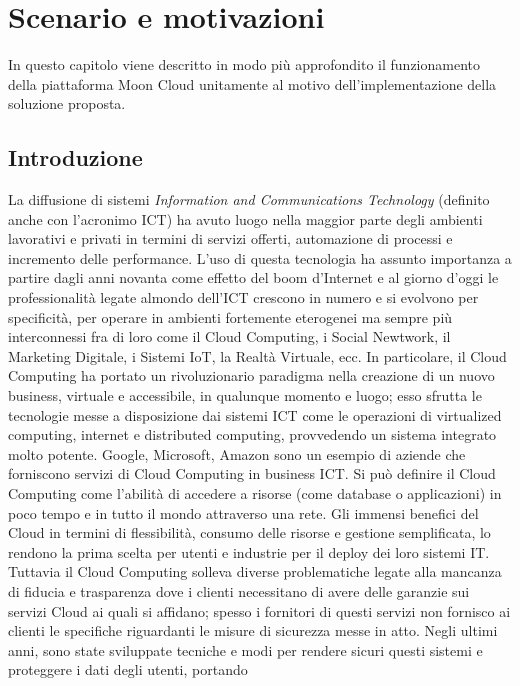 \chapter{Scenario e motivazioni}\label{chp:01-overview}
In questo capitolo viene descritto in modo più approfondito il funzionamento della piattaforma Moon Cloud unitamente al 
motivo dell'implementazione della soluzione proposta.
%
\section{Introduzione}
La diffusione di sistemi \textit{Information and Communications Technology} (definito anche con l'acronimo ICT) ha avuto luogo nella 
maggior parte degli ambienti lavorativi e privati in termini di servizi offerti, automazione di processi e incremento delle performance. 
L'uso di questa tecnologia ha assunto importanza a partire dagli anni novanta come effetto del boom d'Internet e al giorno d'oggi le 
professionalità legate almondo dell'ICT crescono in numero e si evolvono per specificità, per operare in ambienti fortemente eterogenei 
ma sempre più interconnessi fra di loro come il Cloud Computing, i Social Newtwork, il Marketing Digitale, i Sistemi IoT, 
la Realtà Virtuale, ecc.
\vspace{0.5 cm}
\hfill\break
In particolare, il Cloud Computing ha portato un rivoluzionario paradigma nella creazione di un nuovo business, virtuale e accessibile, 
in qualunque momento e luogo; esso sfrutta le tecnologie messe a disposizione dai sistemi ICT come le operazioni di virtualized computing, 
internet e distributed computing, provvedendo un sistema integrato molto potente. Google, Microsoft, Amazon sono un esempio di 
aziende che forniscono servizi di Cloud Computing in business ICT. Si può definire il Cloud Computing come l'abilità di accedere a 
risorse (come database o applicazioni) in poco tempo e in tutto il mondo attraverso una rete.\hfill\break
Gli immensi benefici del Cloud in termini di flessibilità, consumo delle risorse e gestione semplificata, lo rendono la prima scelta per 
utenti e industrie per il deploy dei loro sistemi IT. Tuttavia il Cloud Computing solleva diverse problematiche legate alla mancanza di 
fiducia e trasparenza dove i clienti necessitano di avere delle garanzie sui servizi Cloud ai quali si affidano; spesso i fornitori di 
questi servizi non fornisco ai clienti le specifiche riguardanti le misure di sicurezza messe in atto.\hfill\break
Negli ultimi anni, sono state sviluppate tecniche e modi per rendere sicuri questi sistemi e proteggere i dati degli utenti, portando 
